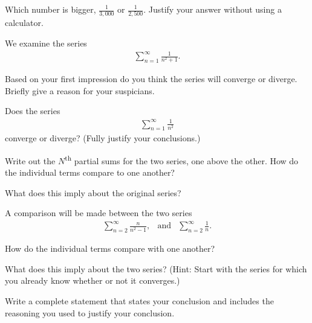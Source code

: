 \begin{problem}
  \item Which number is bigger, $\frac{1}{3,000}$ or $\frac{1}{2,500}$. Justify your answer without using a calculator.
    \vspace{1em}
  \item We examine the series
  \begin{eqnarray*}
    \sum^\infty_{n=1} \frac{1}{n^2+1}.
  \end{eqnarray*}
  \begin{subproblem}
    \item Based on your first impression do you think the series will converge or diverge. Briefly give a reason for your suspicians.
    \vfill
    \item Does the series
    \begin{eqnarray*}
      \sum^\infty_{n=1} \frac{1}{n^2}
    \end{eqnarray*}
    converge or diverge? (Fully justify your conclusions.)
    \vfill
    \item Write out the $N$\textsuperscript{th} partial sums for the two series, one above the other. How do the individual terms compare to one another?
      \vfill
    \item What does this imply about the original series?
    \vfill
  \end{subproblem}
  \clearpage

  \item A comparison will be made between the two series
  \begin{eqnarray*}
    \sum^\infty_{n=2} \frac{n}{n^2-1}, & \mathrm{and} &  \sum^\infty_{n=2} \frac{1}{n}.
  \end{eqnarray*}
  \begin{subproblem}
    \item How do the individual terms compare with one another?
    \vfill
    \item What does this imply about the two series? (Hint: Start with the series for which you already know whether or not it converges.)
    \vfill
    \vfill
    \item Write a complete statement that states your conclusion and includes the reasoning you used to justify your conclusion.
    \vspace{2em}
  \end{subproblem}
  \clearpage


\end{problem}
